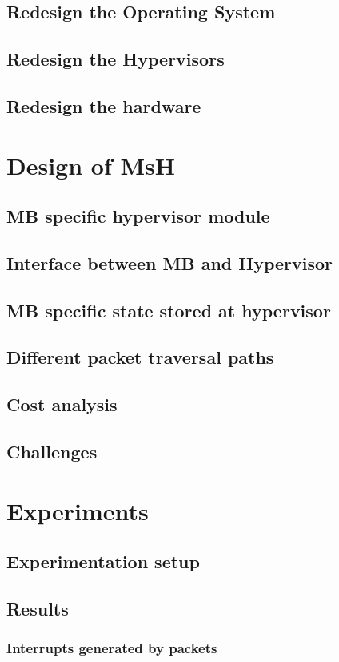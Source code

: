 \documentclass[a4paper,11pt]{report}
\begin{document}
\section{Redesign the Operating System}
\section{Redesign the Hypervisors}
\section{Redesign the hardware}

\chapter{Design of MsH}
\section{MB specific hypervisor module}
\section{Interface between MB and Hypervisor}
\section{MB specific state stored at hypervisor}
\section{Different packet traversal paths}
\section{Cost analysis}
\section{Challenges}

\chapter{Experiments}
\section{Experimentation setup}
\section{Results}
\subsection{Interrupts generated by packets}
\end{document}
